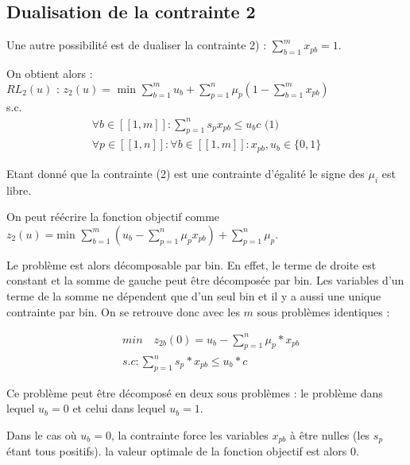 \documentclass{article}
\begin{document}
\subsection{Dualisation de la contrainte 2}

Une autre possibilité est de dualiser la contrainte 2) : $\sum_{b=1}^m x_{pb} = 1$. \newline

On obtient alors :\\
$RL_2(u) \text{ : } z_2(u) = \text{ min } \sum \limits_{b = 1}^{m} u_b + \sum \limits_{p = 1}^{n} \mu_p (1 - \sum \limits_{b = 1}^{m} x_{pb})$\\
s.c.
\begin{align*}
 \forall b \in [\![ 1 , m ]\!] : \sum \limits_{p = 1}^{n} s_p x_{pb} \leqslant u_b c \text{ (1)}\\
 \forall p \in [\![ 1 , n ]\!] : \forall b \in [\![ 1 , m ]\!] : x_{pb}, u_b \in \{0,1\}
\end{align*}

Etant donné que la contrainte (2) est une contrainte d'égalité le signe des $\mu_i$ est libre.\newline

On peut réécrire la fonction objectif comme $z_2(u) = \text{min } \sum \limits_{b = 1}^{m} \left( u_b - \sum \limits_{p = 1}^{n} \mu_p x_{pb} \right) + \sum \limits_{p = 1}^{n} \mu_p$.\newline

Le problème est alors décomposable par bin. En effet, le terme de droite est constant et la somme de gauche peut être décomposée par bin. Les variables d'un terme de la somme ne dépendent que d'un seul bin et il y a aussi une unique contrainte par bin. On se retrouve donc avec les $m$ sous problèmes identiques :

\begin{align*}
    &min \quad z_{2b}(0) = u_b - \sum \limits_{p=1}^n \mu_p*x_{pb}\\
    &s.c: \sum \limits_{p=1}^n s_p*x_{pb} \leq u_b*c
\end{align*}

Ce problème peut être décomposé en deux sous problèmes : le problème dans lequel $u_b = 0$ et celui dans lequel $u_b = 1$.\newline

Dans le cas où $u_b = 0$, la contrainte force les variables $x_{pb}$ à être nulles (les $s_p$ étant tous positifs).
la valeur optimale de la fonction objectif est alors $0$. \newline
\end{document}

